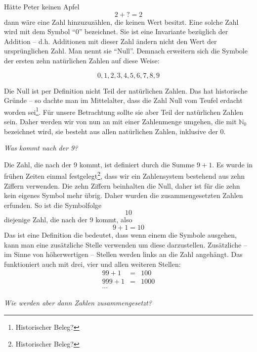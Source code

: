 \noindent Hätte Peter keinen Apfel
\[2+?=2\]
dann wäre eine Zahl hinzuzuzählen, die keinen Wert besitzt. Eine solche Zahl wird mit dem Symbol "`0"' bezeichnet. Sie ist eine Invariante bezüglich der Addition -- d.h. Additionen mit dieser Zahl ändern nicht den Wert der ursprünglichen Zahl. Man nennt sie "`Null"'. Demnach erweitern sich die Symbole der ersten zehn natürlichen Zahlen auf diese Weise:

\[0,1,2,3,4,5,6,7,8,9\]

Die Null ist per Definition nicht Teil der natürlichen Zahlen. Das hat historische Gründe -- so dachte man im Mittelalter, dass die Zahl Null vom Teufel erdacht worden sei\footnote{Historischer Beleg?}. Für unsere Betrachtung sollte sie aber Teil der natürlichen Zahlen sein. Daher werden wir von nun an mit einer Zahlenmenge umgehen, die mit $\mathbb{N}_0$ bezeichnet wird, sie besteht aus allen natürlichen Zahlen, inklusive der 0.

\textsl{Was kommt nach der 9?}

Die Zahl, die nach der 9 kommt, ist definiert durch die Summe $9+1$. Es wurde in frühen Zeiten einmal festgelegt\footnote{Historischer Beleg?}, dass wir ein Zahlensystem bestehend aus zehn Ziffern verwenden. Die zehn Ziffern beinhalten die Null, daher ist für die zehn kein eigenes Symbol mehr übrig. Daher wurden die zusammengesetzten Zahlen erfunden. So ist die Symbolfolge
\[10\]
diejenige Zahl, die nach der 9 kommt, also
\[9+1=10\]
Das ist eine Definition die bedeutet, dass wenn einem die Symbole ausgehen, kann man eine zusätzliche Stelle verwenden um diese darzustellen. Zusätzliche -- im Sinne von höherwertigen -- Stellen werden links an die Zahl angehängt. Das funktioniert auch mit drei, vier und allen weiteren Stellen:
\begin{eqnarray*}
99+1 &=& 100 \\
999+1 &=& 1000 \\
\cdots
\end{eqnarray*}

\noindent \textsl{Wie werden aber dann Zahlen zusammengesetzt?}

